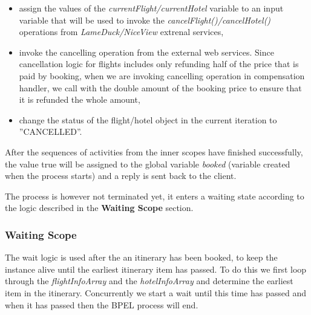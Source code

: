 \begin{itemize}
\item assign the values of the \textit{currentFlight/currentHotel} variable to an input variable that will be used to invoke the \textit{cancelFlight()/cancelHotel()} operations from \textit{LameDuck/NiceView} extrenal services,
\item invoke the cancelling operation from the external web services. Since cancellation logic for flights includes only refunding half of the price that is paid by booking, when we are invoking cancelling operation in compensation handler, we call with the double amount of the booking price to ensure that it is refunded the whole amount,
\item change the status of the flight/hotel object in the current iteration to ''CANCELLED''.
\end{itemize}

After the sequences of activities from the inner scopes have finished successfully, the value true will be assigned to the global variable \textit{booked} (variable created when the process starts) and a reply is sent back to the client. 

The process is however not terminated yet, it enters a waiting state according to the logic described in the \textbf{Waiting Scope} section.

\subsubsection*{Waiting Scope}

The wait logic is used after the an itinerary has been booked, to keep the instance alive until the earliest itinerary item has passed. To do this we first loop through the \textit{flightInfoArray} and the \textit{hotelInfoArray} and determine the earliest item in the itinerary. Concurrently we start a wait until this time has passed and when it has passed then the BPEL process will end.
